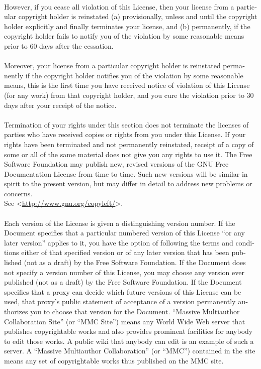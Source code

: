 \documentclass[11pt,a5paper,twoside]{book}
\newcommand{\BETEREURL}[1]{\mbox{<\url{#1}>}}
\begin{document}
\begin{english}
\paragraph{}However, if you cease all violation of this License, then your license
from a particular copyright holder is reinstated (a) provisionally,
unless and until the copyright holder explicitly and finally
terminates your license, and (b) permanently, if the copyright holder
fails to notify you of the violation by some reasonable means prior to
60 days after the cessation.
\paragraph{}Moreover, your license from a particular copyright holder is
reinstated permanently if the copyright holder notifies you of the
violation by some reasonable means, this is the first time you have
received notice of violation of this License (for any work) from that
copyright holder, and you cure the violation prior to 30 days after
your receipt of the notice.
\paragraph{} Termination of your rights under this section does not terminate the
licenses of parties who have received copies or rights from you under
this License.  If your rights have been terminated and not permanently
reinstated, receipt of a copy of some or all of the same material does
not give you any rights to use it.
The Free Software Foundation may publish new, revised versions of the
GNU Free Documentation License from time to time.  Such new versions
will be similar in spirit to the present version, but may differ in
detail to address new problems or concerns.\\
See \BETEREURL{http://www.gnu.org/copyleft/}.
\paragraph{} Each version of the License is given a distinguishing version number.
If the Document specifies that a particular numbered version of this
License “or any later version” applies to it, you have the option of
following the terms and conditions either of that specified version or
of any later version that has been published (not as a draft) by the
Free Software Foundation.  If the Document does not specify a version
number of this License, you may choose any version ever published (not
as a draft) by the Free Software Foundation.  If the Document
specifies that a proxy can decide which future versions of this
License can be used, that proxy’s public statement of acceptance of a
version permanently authorizes you to choose that version for the
Document.
“Massive Multiauthor Collaboration Site” (or “MMC Site”) means any
World Wide Web server that publishes copyrightable works and also
provides prominent facilities for anybody to edit those works.  A
public wiki that anybody can edit is an example of such a server.  A 
“Massive Multiauthor Collaboration” (or “MMC”) contained in the site
means any set of copyrightable works thus published on the MMC site.

\end{english}
\end{document}
